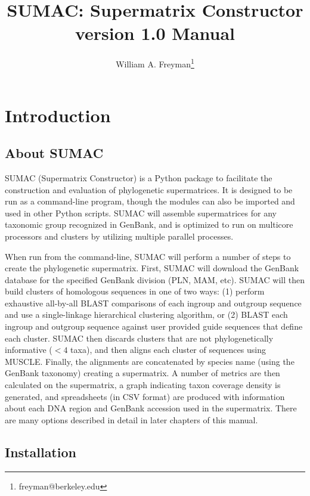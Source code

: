 \documentclass[12pt]{report}
\title{SUMAC: Supermatrix Constructor version 1.0 Manual}
\author{William A. Freyman\thanks{freyman@berkeley.edu}}
\affil{Department of Integrative Biology, University of California, Berkeley}
\date{}
\begin{document}
\maketitle

\tableofcontents


\chapter{Introduction}

\section{About SUMAC}

SUMAC (Supermatrix Constructor) is a Python package to facilitate the construction 
and evaluation of
phylogenetic supermatrices. It is designed to be run as a command-line program, though
the modules can also be imported and used in other Python scripts.
SUMAC will assemble
supermatrices for any taxonomic group recognized in GenBank,
and is optimized to run on multicore processors and clusters by utilizing multiple parallel processes.

When run from the command-line, SUMAC will perform a number of steps to create
the phylogenetic supermatrix. 
First, SUMAC will download the GenBank database for the specified GenBank division (PLN, MAM, etc).
SUMAC will then build clusters of homologous sequences in one of two ways:
(1) perform exhaustive all-by-all BLAST comparisons of each ingroup and outgroup sequence
and use a single-linkage hierarchical clustering algorithm, or
(2) BLAST each ingroup and outgroup sequence against user provided guide sequences
that define each cluster.
SUMAC then discards clusters that are not phylogenetically informative ($< 4$ taxa), 
and then aligns each cluster of sequences using MUSCLE.
Finally, the alignments are concatenated by species name (using the GenBank taxonomy) 
creating a supermatrix. A number of metrics are then calculated on the supermatrix, 
a graph indicating taxon coverage density is generated, and spreadsheets (in CSV format)
are produced with information about each DNA region and GenBank accession used in 
the supermatrix. 
There are many options described in
detail in later chapters of this manual. 


\section{Installation}
\end{document}
